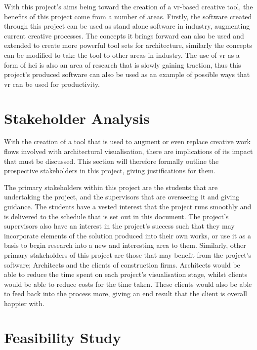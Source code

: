     With this project's aims being toward the creation of a \acrshort{vr}-based creative tool, the benefits of this project come from a number of areas. Firstly, the software created through this project can be used as stand alone software in industry, augmenting current creative processes. The concepts it brings forward can also be used and extended to create more powerful tool sets for architecture, similarly the concepts can be modified to take the tool to other areas in industry. The use of \acrshort{vr} as a form of \acrshort{hci} is also an area of research that is slowly gaining traction, thus this project's produced software can also be used as an example of possible ways that \acrshort{vr} can be used for productivity.
    
\section{Stakeholder Analysis}

    With the creation of a tool that is used to augment or even replace creative work flows involved with architectural visualisation, there are implications of its impact that must be discussed. This section will therefore formally outline the prospective stakeholders in this project, giving justifications for them.

    The primary stakeholders within this project are the students that are undertaking the project, and the supervisors that are overseeing it and giving guidance. The students have a vested interest that the project runs smoothly and is delivered to the schedule that is set out in this document. The project's supervisors also have an interest in the project's success such that they may incorporate elements of the solution produced into their own works, or use it as a basis to begin research into a new and interesting area to them. Similarly, other primary stakeholders of this project are those that may benefit from the project's software; Architects and the clients of construction firms. Architects would be able to reduce the time spent on each project's visualisation stage, whilst clients would be able to reduce costs for the time taken. These clients would also be able to feed back into the process more, giving an end result that the client is overall happier with.

\section{Feasibility Study}


